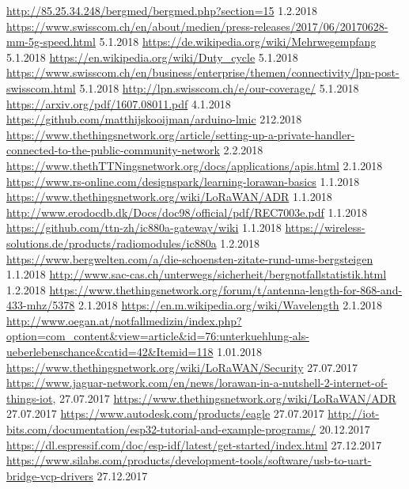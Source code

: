 \documentclass[11pt,english,german]{report}
\theoremstyle{definition}
\begin{document}
\begin{thebibliography}{1}
	 \url{http://85.25.34.248/bergmed/bergmed.php?section=15} 1.2.2018
	 \url{https://www.swisscom.ch/en/about/medien/press-releases/2017/06/20170628-mm-5g-speed.html} 5.1.2018
	 \url{https://de.wikipedia.org/wiki/Mehrwegempfang} 5.1.2018
	 \url{https://en.wikipedia.org/wiki/Duty_cycle} 5.1.2018
	 \url{https://www.swisscom.ch/en/business/enterprise/themen/connectivity/lpn-post-swisscom.html} 5.1.2018
	 \url{http://lpn.swisscom.ch/e/our-coverage/} 5.1.2018
	 \url{https://arxiv.org/pdf/1607.08011.pdf} 4.1.2018
	 \url{https://github.com/matthijskooijman/arduino-lmic} 212.2018
	 \url{https://www.thethingsnetwork.org/article/setting-up-a-private-handler-connected-to-the-public-community-network} 2.2.2018
	 \url{https://www.thethTTNingsnetwork.org/docs/applications/apis.html} 2.1.2018
	 \url{https://www.rs-online.com/designspark/learning-lorawan-basics} 1.1.2018
	 \url{https://www.thethingsnetwork.org/wiki/LoRaWAN/ADR} 1.1.2018
	 \url{http://www.erodocdb.dk/Docs/doc98/official/pdf/REC7003e.pdf} 1.1.2018
	 \url{https://github.com/ttn-zh/ic880a-gateway/wiki} 1.1.2018
	 \url{https://wireless-solutions.de/products/radiomodules/ic880a} 1.2.2018
	 \url{https://www.bergwelten.com/a/die-schoensten-zitate-rund-ums-bergsteigen} 1.1.2018
	 \url{http://www.sac-cas.ch/unterwegs/sicherheit/bergnotfallstatistik.html} 1.2.2018
	 \url{https://www.thethingsnetwork.org/forum/t/antenna-length-for-868-and-433-mhz/5378} 2.1.2018
	 \url{https://en.m.wikipedia.org/wiki/Wavelength} 2.1.2018\\
	 \url{http://www.oegan.at/notfallmedizin/index.php?option=com_content&view=article&id=76:unterkuehlung-als-ueberlebenschance&catid=42&Itemid=118} 1.01.2018
	 \url{https://www.thethingsnetwork.org/wiki/LoRaWAN/Security} 27.07.2017
	 \url{https://www.jaguar-network.com/en/news/lorawan-in-a-nutshell-2-internet-of-things-iot}, 27.07.2017
	 \url{https://www.thethingsnetwork.org/wiki/LoRaWAN/ADR} 27.07.2017
	 \url{https://www.autodesk.com/products/eagle} 27.07.2017
	 \url{http://iot-bits.com/documentation/esp32-tutorial-and-example-programs/} 20.12.2017
	 \url{https://dl.espressif.com/doc/esp-idf/latest/get-started/index.html} 27.12.2017
	 \url{https://www.silabs.com/products/development-tools/software/usb-to-uart-bridge-vcp-drivers} 27.12.2017
\end{thebibliography}
\end{document}

